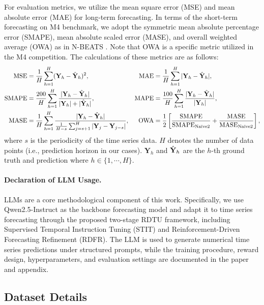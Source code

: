 For evaluation metrics, we utilize the mean square error (MSE) and mean absolute error (MAE) for long-term forecasting. In terms of the short-term forecasting on M4 benchmark, we adopt the symmetric mean absolute percentage error (SMAPE), mean absolute scaled error (MASE), and overall weighted average (OWA) as in N-BEATS \citep{oreshkin2019n}. Note that OWA is a specific metric utilized in the M4 competition. The calculations of these metrics are as follows:
\begin{align*} \label{equ:metrics}
    \text{MSE} &= \frac{1}{H}\sum_{h=1}^H (\mathbf{Y}_{h} - \Hat{\mathbf{Y}}_{h})^2,
    &
    \text{MAE} &= \frac{1}{H}\sum_{h=1}^H|\mathbf{Y}_{h} - \Hat{\mathbf{Y}}_{h}|,\\
    \text{SMAPE} &= \frac{200}{H} \sum_{h=1}^H \frac{|\mathbf{Y}_{h} - \Hat{\mathbf{Y}}_{h}|}{|\mathbf{Y}_{h}| + |\Hat{\mathbf{Y}}_{h}|},
    &
    \text{MAPE} &= \frac{100}{H} \sum_{h=1}^H \frac{|\mathbf{Y}_{h} - \Hat{\mathbf{Y}}_{h}|}{|\mathbf{Y}_{h}|}, \\
    \text{MASE} &= \frac{1}{H} \sum_{h=1}^H \frac{|\mathbf{Y}_{h} - \Hat{\mathbf{Y}}_{h}|}{\frac{1}{H-s}\sum_{j=s+1}^{H}|\mathbf{Y}_j - \mathbf{Y}_{j-s}|},
    &
    \text{OWA} &= \frac{1}{2} \left[ \frac{\text{SMAPE}}{\text{SMAPE}_{\textrm{Naïve2}}}  + \frac{\text{MASE}}{\text{MASE}_{\textrm{Naïve2}}}  \right],
\end{align*}
where $s$ is the periodicity of the time series data. $H$ denotes the number of data points (i.e., prediction horizon in our cases). $\mathbf{Y}_{h}$ and $\Hat{\mathbf{Y}}_{h}$ are the $h$-th ground truth and prediction where $h \in \{1, \cdots, H\}$.

\paragraph{Declaration of LLM Usage.}

LLMs are a core methodological component of this work. Specifically, we use Qwen2.5-Instruct as the backbone forecasting model and adapt it to time series forecasting through the proposed two-stage RDTU framework, including Supervised Temporal Instruction Tuning (STIT) and Reinforcement-Driven Forecasting Refinement (RDFR). The LLM is used to generate numerical time series predictions under structured prompts, while the training procedure, reward design, hyperparameters, and evaluation settings are documented in the paper and appendix.

\subsection{Dataset Details}

